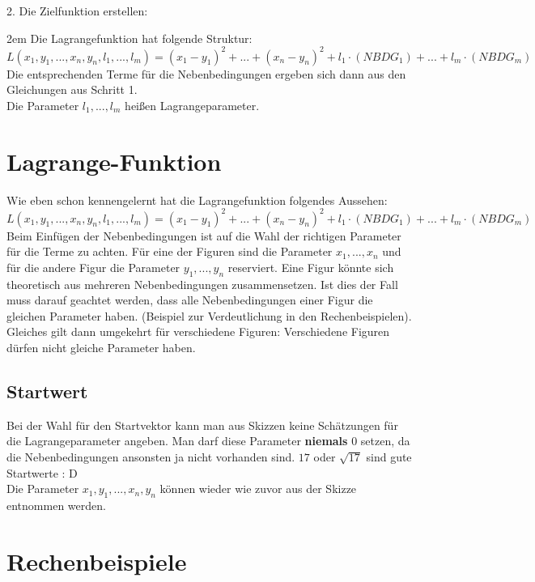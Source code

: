 \documentclass[11pt,final]{scrreprt}
\begin{document}
2. Die Zielfunktion erstellen:

\begingroup
\leftskip2em 
Die Lagrangefunktion hat folgende Struktur:\\
$ L(x_1, y_1, ..., x_n, y_n, l_1, ..., l_m) = (x_1-y_1)^2+...+(x_n-y_n)^2+l_1\cdot(NBDG_1)+...+l_m\cdot(NBDG_m)$\\
Die entsprechenden Terme für die Nebenbedingungen ergeben sich dann aus den Gleichungen aus Schritt 1.\\
Die Parameter $l_1, ..., l_m$ heißen Lagrangeparameter.
\par	
\endgroup

\section{Lagrange-Funktion}

Wie eben schon kennengelernt hat die Lagrangefunktion folgendes Aussehen:\\
$ L(x_1, y_1, ..., x_n, y_n, l_1, ..., l_m) = (x_1-y_1)^2+...+(x_n-y_n)^2+l_1\cdot(NBDG_1)+...+l_m\cdot(NBDG_m)$\\

Beim Einfügen der Nebenbedingungen ist auf die Wahl der richtigen Parameter für die Terme zu achten. Für eine der Figuren sind die Parameter $x_1, ..., x_n$ und für die andere Figur die Parameter $y_1, ..., y_n$ reserviert. Eine Figur könnte sich theoretisch aus mehreren Nebenbedingungen zusammensetzen. Ist dies der Fall muss darauf geachtet werden, dass alle Nebenbedingungen einer Figur die gleichen Parameter haben. (Beispiel zur Verdeutlichung in den Rechenbeispielen).\\
Gleiches gilt dann umgekehrt für verschiedene Figuren: Verschiedene Figuren dürfen nicht gleiche Parameter haben.\\

\subsection{Startwert}

Bei der Wahl für den Startvektor kann man aus Skizzen keine Schätzungen für die Lagrangeparameter angeben. Man darf diese Parameter \textbf{niemals} $0$ setzen, da die Nebenbedingungen ansonsten ja nicht vorhanden sind. $17$ oder $\sqrt{17}$ sind gute Startwerte : D\\
Die Parameter $x_1, y_1, ..., x_n, y_n$ können wieder wie zuvor aus der Skizze entnommen werden.

\section{Rechenbeispiele}
\end{document}
